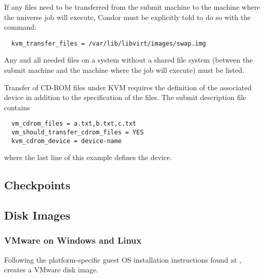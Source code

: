 If any files need to be transferred from the submit machine
to the machine where the  universe job will execute,
Condor must be explicitly told to do so with the
 command:
\footnotesize
\begin{verbatim}
  kvm_transfer_files = /var/lib/libvirt/images/swap.img
\end{verbatim}
\normalsize
Any and all needed files on a system without a shared file
system (between the submit machine and the machine where the
job will execute) must be listed.

Transfer of CD-ROM files under KVM requires the definition of
the associated device in addition to the specification of the
files.
The submit description file contains
\begin{verbatim}
  vm_cdrom_files = a.txt,b.txt,c.txt
  vm_should_transfer_cdrom_files = YES
  kvm_cdrom_device = device-name
\end{verbatim}
where the last line of this example defines the device.

\subsection{\label{sec:vm-checkpoints}Checkpoints}
\Todo

\subsection{\label{sec:vm-disk-image-details}Disk Images}

\subsubsection{\label{sec:vm-disk-image-details-vmware}
VMware on Windows and Linux}



Following the platform-specific
guest OS installation instructions found at
,
creates a VMware disk image.

